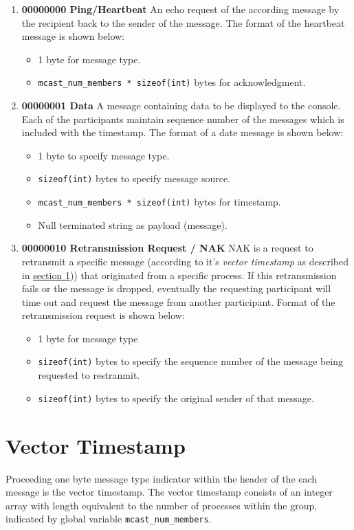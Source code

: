 \documentclass[11pt]{report}
\begin{document}
		\begin{enumerate}
			\item {\bf 00000000 Ping/Heartbeat}
				An echo request of the according message by the recipient back to the sender of the message.  The format of the heartbeat message is shown below:
				\begin{itemize}
					\item 1 byte for message type.
					\item \verb+mcast_num_members * sizeof(int)+ bytes for acknowledgment.
				\end{itemize}
			\item {\bf 00000001 Data }
				A message containing data to be displayed to the console. Each of the participants maintain sequence number of the messages which is included with the timestamp. The format of a date message is shown below:
				\begin{itemize}
					 \item 1 byte to specify message type.
					\item \verb+sizeof(int)+ bytes to specify message source.
					\item \verb+mcast_num_members * sizeof(int)+ bytes for timestamp.
					\item Null terminated string as payload (message).
				\end{itemize}

			\item {\bf 00000010 Retransmission Request / NAK }
				NAK is a request to retransmit a specific message (according to it's \emph{vector timestamp} as described in \hyperref[sec:vectorTimeStamp]{ section \ref*{sec:vectorTimeStamp}})) that originated from a specific process. If this retransmission fails or the message is dropped, eventually the requesting participant will time out and request the message from another participant. Format of the retransmission request is shown below:
				\begin{itemize}
				 	\item 1 byte for message type
					\item \verb+sizeof(int)+ bytes to specify the sequence number of the message being requested to restranmit.
					\item \verb+sizeof(int)+ bytes to specify the original sender of that message.
				\end{itemize}

		\end{enumerate}


	\section{Vector Timestamp}
	\label{sec:vectorTimeStamp}
		Proceeding one byte message type indicator within the header of the each message is the vector timestamp.  The vector timestamp consists of an integer array with length equivalent to the number of processes within the group, indicated by global variable \verb+mcast_num_members+.  
		
\end{document}
